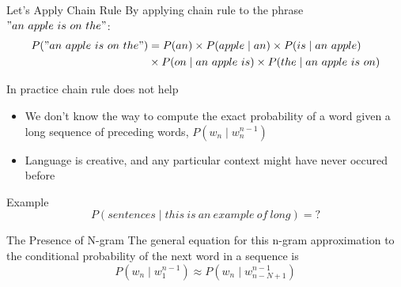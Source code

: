 \documentclass{beamer}
\begin{document}
\begin{frame}{Let's Apply Chain Rule}
By applying chain rule to the phrase $"an\ apple\ is\ on\ the"$:
    \begin{align*}
        P("an\ apple\ is\ on\ the") &= P(an)\times P(apple\mid an) \times P(is\mid an\ apple)\\
                                  &\times P(on\mid an\ apple\ is) \times P(the\mid an\ apple\ is\ on) 
    \end{align*}
\end{frame}

\begin{frame}{In practice chain rule does not help}
    \begin{itemize}
        \item We don't know the way to compute the exact probability of a word given a long sequence of preceding words, $P(w_n\mid w_n^{n-1})$
        \item Language is creative, and any particular context might have never occured before
    \end{itemize}
    \begin{block}{Example}
        $$P(sentences\mid this\ is\ an\ example\ of\ long) = \mathord{?}$$
    \end{block}
\end{frame}

\begin{frame}{The Presence of N-gram}
    The general equation for this n-gram approximation to the conditional probability of the next word in a sequence is
    $$P(w_n\mid w_1^{n-1}) \approx P(w_n\mid w_{n-N+1}^{n-1})$$


\end{frame}

\end{document}
